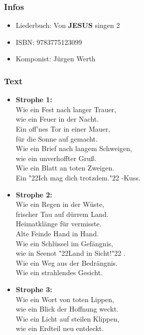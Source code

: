 \documentclass[10pt,a5paper]{article}
\newcommand{\Jesus}[0]{\textbf{JESUS}}
\newcommand{\q}[1]{\char"22{#1}\char"22 }
\begin{document}
		\subsubsection{Infos}
		\begin{itemize}[nosep]
			\item Liederbuch: Von {\Jesus} singen 2
			\item ISBN: 9783775123099
			\item Komponist: J\"urgen Werth
		\end{itemize}
		
		\subsubsection{Text}
		\begin{itemize}
			\item	\textbf{Strophe 1:}
			\\		Wie ein Fest nach langer Trauer,
			\\		wie ein Feuer in der Nacht.
			\\		Ein off'nes Tor in einer Mauer,
			\\		f\"ur die Sonne auf gemacht.
			\\		Wie ein Brief nach langem Schweigen,
			\\		wie ein unverhoffter Gru{\ss}.
			\\		Wie ein Blatt an toten Zweigen.
			\\		Ein \q{Ich mag dich trotzdem.}-Kuss.
			\item	\textbf{Strophe 2:}
			\\		Wie ein Regen in der W\"uste,
			\\		frischer Tau auf d\"urrem Land.
			\\		Heimatkl\"ange für vermisste.
			\\		Alte Feinde Hand in Hand.
			\\		Wie ein Schl\"ussel im Gef\"angnis,
			\\		wie in Seenot \q{Land in Sicht!}.
			\\		Wie ein Weg aus der Bedr\"angnis.
			\\		Wie ein strahlendes Gesicht.
			\item	\textbf{Strophe 3:}
			\\		Wie ein Wort von toten Lippen,
			\\		wie ein Blick der Hoffnung weckt.
			\\		Wie ein Licht auf steilen Klippen,
			\\		wie ein Erdteil neu entdeckt.

\end{itemize}
\end{document}
